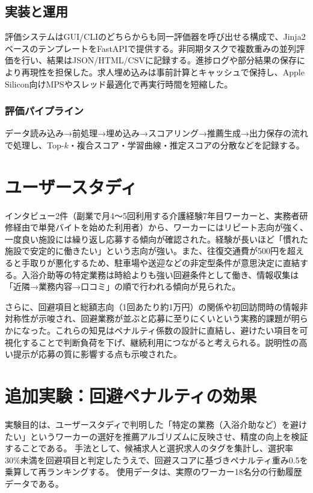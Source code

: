 \documentclass[twocolumn,a4j,dvipdfmx]{jsarticle_customized1}
\begin{document}
\subsection{実装と運用}
評価システムはGUI/CLIのどちらからも同一評価器を呼び出せる構成で、Jinja2ベースのテンプレートをFastAPIで提供する\cite{jinja2,fastapi}。非同期タスクで複数重みの並列評価を行い、結果はJSON/HTML/CSVに記録する。進捗ログや部分結果の保存により再現性を担保した。求人埋め込みは事前計算とキャッシュで保持し、Apple Silicon向けMPS\cite{mps}やスレッド最適化で再実行時間を短縮した。

\subsubsection*{評価パイプライン}
データ読み込み→前処理→埋め込み→スコアリング→推薦生成→出力保存の流れで処理し、Top-$k$・複合スコア・学習曲線・推定スコアの分散などを記録する。

\section{ユーザースタディ}
インタビュー2件（副業で月4〜5回利用する介護経験7年目ワーカーと、実務者研修経由で単発バイトを始めた利用者）から、ワーカーにはリピート志向が強く、一度良い施設には繰り返し応募する傾向が確認された。経験が長いほど「慣れた施設で安定的に働きたい」という志向が強い。また、往復交通費が500円を超えると手取りが悪化するため、駐車場や送迎などの非定型条件が意思決定に直結する。入浴介助等の特定業務は時給よりも強い回避条件として働き、情報収集は「近隣→業務内容→口コミ」の順で行われる傾向が見られた。

さらに、回避項目と総額志向（1回あたり約1万円）の関係や初回訪問時の情報非対称性が示唆され、回避業務が並ぶと応募に至りにくいという実務的課題が明らかになった。これらの知見はペナルティ係数の設計に直結し、避けたい項目を可視化することで判断負荷を下げ、継続利用につながると考えられる。説明性の高い提示が応募の質に影響する点も示唆された。

\section{追加実験：回避ペナルティの効果}
実験目的は、ユーザースタディで判明した「特定の業務（入浴介助など）を避けたい」というワーカーの選好を推薦アルゴリズムに反映させ、精度の向上を検証することである。
手法として、候補求人と選択求人のタグを集計し、選択率30\%未満を回避項目と判定したうえで、回避スコアに基づきペナルティ重み0.5を乗算して再ランキングする。
使用データは、実際のワーカー18名分の行動履歴データである。
\end{document}
